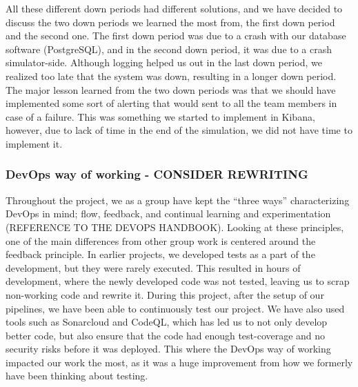 All these different down periods had different solutions, and we have decided to discuss the two down periods we learned the most from, the first down period and the second one. The first down period was due to a crash with our database software (PostgreSQL), and in the second down period, it was due to a crash simulator-side. Although logging helped us out in the last down period, we realized too late that the system was down, resulting in a longer down period. The major lesson learned from the two down periods was that we should have implemented some sort of alerting that would sent to all the team members in case of a failure. This was something we started to implement in Kibana, however, due to lack of time in the end of the simulation, we did not have time to implement it.

\subsubsection{DevOps way of working - CONSIDER REWRITING}

Throughout the project, we as a group have kept the “three ways” characterizing DevOps in mind; flow, feedback, and continual learning and experimentation (REFERENCE TO THE DEVOPS HANDBOOK). Looking at these principles, one of the main differences from other group work is centered around the feedback principle. In earlier projects, we developed tests as a part of the development, but they were rarely executed. This resulted in hours of development, where the newly developed code was not tested, leaving us to scrap non-working code and rewrite it. During this project, after the setup of our pipelines, we have been able to continuously test our project. We have also used tools such as Sonarcloud and CodeQL, which has led us to not only develop better code, but also ensure that the code had enough test-coverage and no security risks before it was deployed. This where the DevOps way of working impacted our work the most, as it was a huge improvement from how we formerly have been thinking about testing.